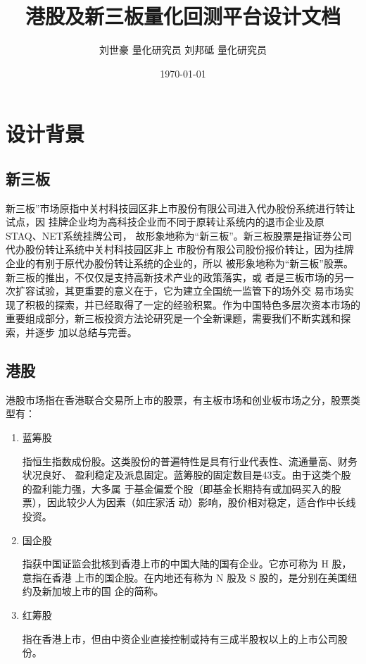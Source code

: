 \documentclass[11pt]{ctexart}
\author{刘世豪 量化研究员 刘邦砥 量化研究员}
\date{\today}
\title{港股及新三板量化回测平台设计文档}
\begin{document}
\maketitle
\tableofcontents


\section{设计背景}
\label{sec:orgb5d7302}
\subsection{新三板}
\label{sec:orgc389e4f}
新三板”市场原指中关村科技园区非上市股份有限公司进入代办股份系统进行转让试点，因
挂牌企业均为高科技企业而不同于原转让系统内的退市企业及原STAQ、NET系统挂牌公司，
故形象地称为“新三板”。新三板股票是指证券公司代办股份转让系统中关村科技园区非上
市股份有限公司股份报价转让，因为挂牌企业的有别于原代办股份转让系统的企业的，所以
被形象地称为“新三板”股票。新三板的推出，不仅仅是支持高新技术产业的政策落实，或
者是三板市场的另一次扩容试验，其更重要的意义在于，它为建立全国统一监管下的场外交
易市场实现了积极的探索，并已经取得了一定的经验积累。作为中国特色多层次资本市场的
重要组成部分，新三板投资方法论研究是一个全新课题，需要我们不断实践和探索，并逐步
加以总结与完善。
\subsection{港股}
\label{sec:orgc5a034f}
港股市场指在香港联合交易所上市的股票，有主板市场和创业板市场之分，股票类型有：
\begin{enumerate}
\item 蓝筹股

指恒生指数成份股。这类股份的普遍特性是具有行业代表性、流通量高、财务状况良好、
盈利稳定及派息固定。蓝筹股的固定数目是43支。由于这类个股的盈利能力强，大多属
于基金偏爱个股（即基金长期持有或加码买入的股票），因此较少人为因素（如庄家活
动）影响，股价相对稳定，适合作中长线投资。

\item 国企股

指获中国证监会批核到香港上市的中国大陆的国有企业。它亦可称为 H 股，意指在香港
上市的国企股。在内地还有称为 N 股及 S 股的，是分别在美国纽约及新加坡上市的国
企的简称。

\item 红筹股

指在香港上市，但由中资企业直接控制或持有三成半股权以上的上市公司股份。
\end{enumerate}
\end{document}
